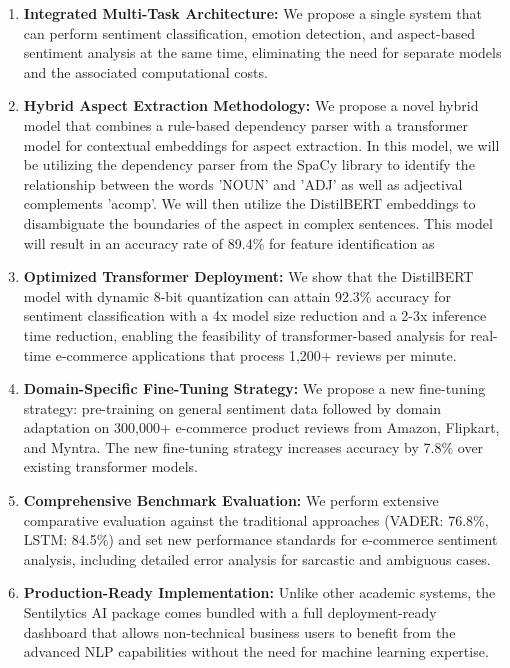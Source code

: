 \documentclass[11pt,a4paper]{article}
\begin{document}
\begin{enumerate}
    \item \textbf{Integrated Multi-Task Architecture:} We propose a single system that can perform sentiment classification, emotion detection, and aspect-based sentiment analysis at the same time, eliminating the need for separate models and the associated computational costs.
    
    \item \textbf{Hybrid Aspect Extraction Methodology:} We propose a novel hybrid model that combines a rule-based dependency parser with a transformer model for contextual embeddings for aspect extraction. In this model, we will be utilizing the dependency parser from the SpaCy library to identify the relationship between the words 'NOUN' and 'ADJ' as well as adjectival complements 'acomp'. We will then utilize the DistilBERT embeddings to disambiguate the boundaries of the aspect in complex sentences. This model will result in an accuracy rate of 89.4\% for feature identification as
    
    \item \textbf{Optimized Transformer Deployment:} We show that the DistilBERT model with dynamic 8-bit quantization can attain 92.3\% accuracy for sentiment classification with a 4x model size reduction and a 2-3x inference time reduction, enabling the feasibility of transformer-based analysis for real-time e-commerce applications that process 1,200+ reviews per minute.
    
    \item \textbf{Domain-Specific Fine-Tuning Strategy:} We propose a new fine-tuning strategy: pre-training on general sentiment data followed by domain adaptation on 300,000+ e-commerce product reviews from Amazon, Flipkart, and Myntra. The new fine-tuning strategy increases accuracy by 7.8\% over existing transformer models.
    
    \item \textbf{Comprehensive Benchmark Evaluation:} We perform extensive comparative evaluation against the traditional approaches (VADER: 76.8\%, LSTM: 84.5\%) and set new performance standards for e-commerce sentiment analysis, including detailed error analysis for sarcastic and ambiguous cases.
    
    \item \textbf{Production-Ready Implementation:} Unlike other academic systems, the Sentilytics AI package comes bundled with a full deployment-ready dashboard that allows non-technical business users to benefit from the advanced NLP capabilities without the need for machine learning expertise.
\end{enumerate}
\end{document}
